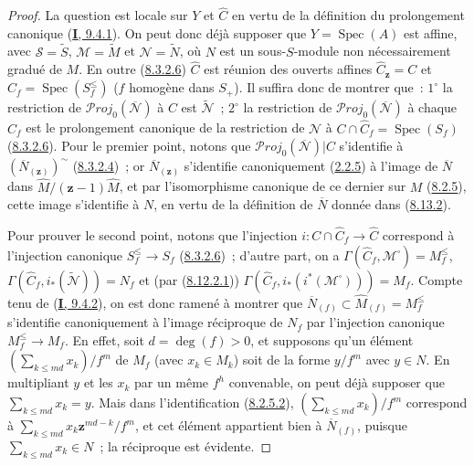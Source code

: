 \begin{proof}
La question est locale sur $Y$ et $\widehat{C}$ en vertu de la définition du
prolongement canonique (\hyperref[I.9.4.1-fr]{\textbf{I}, 9.4.1}). On peut donc déjà
supposer que $Y=\operatorname{Spec}(A)$ est affine, avec
$\mathcal{S}=\widetilde{S}$, $\mathcal{M}=\widetilde{M}$ et
$\mathcal{N}=\widetilde{N}$, où $N$ est un sous-$S$-module non
nécessairement gradué de $M$. En outre
(\hyperref[II.8.3.2.6-fr]{8.3.2.6}) $\widehat{C}$ est réunion des ouverts
affines $\widehat{C}_{\mathbf{z}}=C$ et
$\widehat{C}_f=\operatorname{Spec}(S_f^{\leq})$ ($f$ homogène dans $S_+$).
Il suffira donc de montrer que~: $1^\circ$ la restriction de
$\mathcal{P}\mathit{roj}_0(\overline{\mathcal{N}})$ à $C$ est
$\widetilde{\mathcal{N}}$~; $2^\circ$ la restriction de
$\mathcal{P}\mathit{roj}_0(\overline{\mathcal{N}})$ à chaque $\widehat{C}_f$ est
le prolongement canonique de la restriction de $\mathcal{N}$ à
$C\cap\widehat{C}_f=\operatorname{Spec}(S_f)$
(\hyperref[II.8.3.2.6-fr]{8.3.2.6}). Pour le premier point, notons que
$\mathcal{P}\mathit{roj}_0(\overline{\mathcal{N}})|C$ s'identifie à
$(\overline{N}_{(\mathbf{z})})^{\sim}$
(\hyperref[II.8.3.2.4-fr]{8.3.2.4})~; or $\overline{N}_{(\mathbf{z})}$ s'identifie
canoniquement (\hyperref[II.2.2.5-fr]{2.2.5}) à l'image de
$\overline{N}$ dans $\widehat{M}/(\mathbf{z}-1)\widehat{M}$, et par l'isomorphisme
canonique de ce dernier sur $M$ (\hyperref[II.8.2.5-fr]{8.2.5}), cette image
s'identifie à $N$, en vertu de la définition de $\overline{N}$ donnée dans
(\hyperref[II.8.13.2-fr]{8.13.2}).

Pour prouver le second point, notons que l'injection
$i:C\cap\widehat{C}_f\to\widehat{C}$ correspond à l'injection canonique
$S_f^{\leq}\to S_f$ (\hyperref[II.8.3.2.6-fr]{8.3.2.6})~; d'autre part, on
a $\Gamma(\widehat{C}_f,\mathcal{M}^{\square})=M_f^{\leq}$,
$\Gamma(\widehat{C}_f,i_*(\widetilde{\mathcal{N}}))=N_f$ et (par
(\hyperref[II.8.12.2.1-fr]{8.12.2.1}))
$\Gamma(\widehat{C}_f,i_*(i^*(\mathcal{M}^{\square})))=M_f$. Compte tenu de
(\hyperref[I.9.4.2-fr]{\textbf{I}, 9.4.2}), on est donc ramené à montrer que
$\overline{N}_{(f)}\subset\widehat{M}_{(f)}=M_f^{\leq}$ s'identifie
canoniquement à l'image réciproque de $N_f$ par l'injection canonique
$M_f^{\leq}\to M_f$. En effet, soit $d=\deg(f)>0$, et supposons qu'un
élément $(\sum_{k\leqslant md}x_k)/f^m$ de $M_f$ (avec $x_k\in M_k$) soit de
la forme $y/f^m$ avec $y\in N$. En multipliant $y$ et les $x_k$ par un même
$f^h$ convenable, on peut déjà supposer que $\sum_{k\leqslant md}x_k=y$.
Mais dans l'identification (\hyperref[II.8.2.5.2-fr]{8.2.5.2}),
$(\sum_{k\leqslant md}x_k)/f^m$ correspond à
$\sum_{k\leqslant md}x_k\mathbf{z}^{md-k}/f^m$, et cet élément appartient bien à
$\overline{N}_{(f)}$, puisque $\sum_{k\leqslant md}x_k\in N$~; la réciproque
est évidente.
\end{proof}

